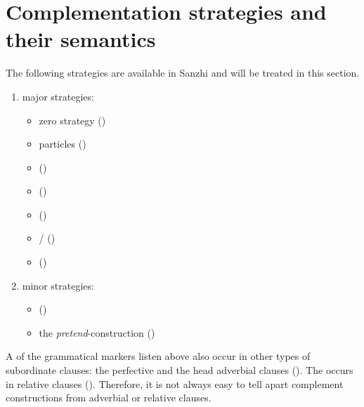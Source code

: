 
\section{Complementation strategies and their semantics}
\label{sec:Complementation strategies and their semantics}

The following  strategies are available in Sanzhi and will be treated in this section.
%
\begin{enumerate}
	\item	major  strategies:
	\begin{itemize}
		\item	zero strategy ()
		\item	{} particles  ()
		\item	{}  ()
		\item	{}  ()
		\item	{}  ()
		\item	{} \slash {} ()
		\item	{}  ()
	\end{itemize}

	\item	minor  strategies:
	\begin{itemize}
		\item	{}  ()
		\item the \textit{pretend}-construction ()
	\end{itemize}
\end{enumerate}

A  of the grammatical markers listen above also occur in other types of subordinate clauses: the perfective and the  head adverbial clauses (). The   occurs in relative clauses (). Therefore, it is not always easy to tell apart complement constructions from adverbial or relative clauses.

